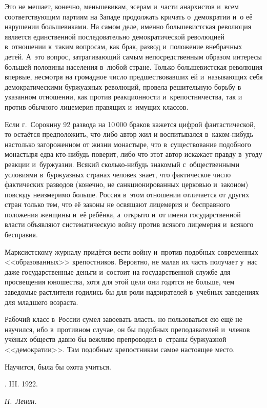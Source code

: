 Это не мешает, конечно, меньшевикам, эсерам и~части анархистов и~всем
соответствующим партиям на Западе продолжать кричать о~демократии и~о её
нарушении большевиками. На самом деле, именно большевистская революция
является единственной последовательно демократической революцией в~отношении
к~таким вопросам, как брак, развод и~положение внебрачных детей. А~это
вопрос, затрагивающий самым непосредственным образом интересы большей
половины населения в~любой стране. Только большевистская революция впервые,
несмотря на громадное число предшествовавших ей и~называющих себя
демократическими буржуазных революций, провела решительную борьбу в
указанном отношении, как против реакционности и~крепостничества, так и
против обычного лицемерия правящих и~имущих классов.

Если г.~Сорокину 92 развода на 10\,000 браков кажется
цифрой фантастической, то остаётся предположить, что либо автор жил и
воспитывался в~каком-нибудь настолько загороженном от жизни монастыре, что
в~существование подобного монастыря едва кто-нибудь поверит, либо что этот
автор искажает правду в~угоду реакции и~буржуазии. Всякий сколько-нибудь
знакомый с~общественными условиями в~буржуазных странах человек знает, что
фактическое число фактических разводов (конечно, не санкционированных
церковью и~законом) повсюду неизмеримо больше. Россия в~этом отношении
отличается от других стран только тем, что её законы не освящают лицемерия
и~бесправного положения женщины и~её ребёнка, а~открыто и~от имени
государственной власти объявляют систематическую войну против всякого
лицемерия и~всякого бесправия.

Марксистскому журналу придётся вести войну и~против подобных современных
<<образованных>> крепостников. Вероятно, не малая их часть получает у~нас даже
государственные деньги и~состоит на государственной службе для просвещения
юношества, хотя для этой цели они годятся не больше, чем заведомые
растлители годились бы для роли надзирателей в~учебных заведениях для
младшего возраста.

Рабочий класс в~России сумел завоевать власть, но пользоваться ею ещё не
научился, ибо в~противном случае, он бы подобных преподавателей и~членов
учёных обществ давно бы вежливо препроводил в~страны буржуазной
<<демократии>>. Там подобным крепостникам самое настоящее место.

\nopagebreak
Научится, была бы охота учиться.

\nopagebreak \medskip
{}. III. 1922.
\nopagebreak \medskip

{\raggedleft \textit{Н.~Ленин.} \par}

\nopagebreak \medskip
\sectionline

\bigskip
